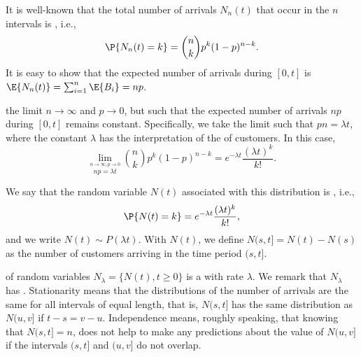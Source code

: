 
It is well-known that the total number of arrivals $N_n(t)$ that occur in the $n$ intervals is , i.e.,
\begin{equation*}
 \P{N_n(t) = k} = {n \choose k} p^k (1-p)^{n-k}.
\end{equation*}
It is easy to show that  the expected number of arrivals during $[0,t]$ is
$  \E{N_n(t)} = \sum_{i=1}^n \E{B_i} = n p$.



 the limit $n\to\infty$ and $p\to0$, but such that the expected number of arrivals $n p$ during $[0,t]$ remains constant.
Specifically, we take the limit such that $p n =\lambda t$, where the constant $\lambda$ has the interpretation of the  of  customers.
In this case,
\begin{equation}\label{eq:bin}
  \lim_{\stackrel{n\to\infty, p\to 0}{np=\lambda t}}{n \choose k} p^k (1-p)^{n-k} = e^{-\lambda t}\frac{(\lambda t)^k}{k!}.
\end{equation}


We say that the random variable $N(t)$
associated with this distribution is , i.e.,
\begin{equation*}
 \P{N(t) = k} =
e^{-\lambda t} \frac{(\lambda t)^k}{k!},
\end{equation*}
and we write $N(t)\sim P(\lambda t)$.
With $N(t)$, we define $N(s, t] = N(t)-N(s)$ as the number of customers arriving in the time period $(s, t]$.\sidenote{Note that $[0,t]$ is closed at both ends, but $(s,t]$ is open at the left.}



 of random variables $N_\lambda=\{N(t), t\geq 0\}$ is a  with rate $\lambda$.
We remark that  $N_\lambda$ has .
Stationarity means that the distributions of the number of arrivals are the same for all intervals of equal length, that is,
$N(s,t]$ has the same distribution as $N(u, v]$ if $t-s = v-u$.
Independence means, roughly speaking, that knowing that $N(s,t]= n$, does not help to make any predictions about the value of $N(u, v]$ if the intervals $(s,t]$ and $(u, v]$ do not overlap.

